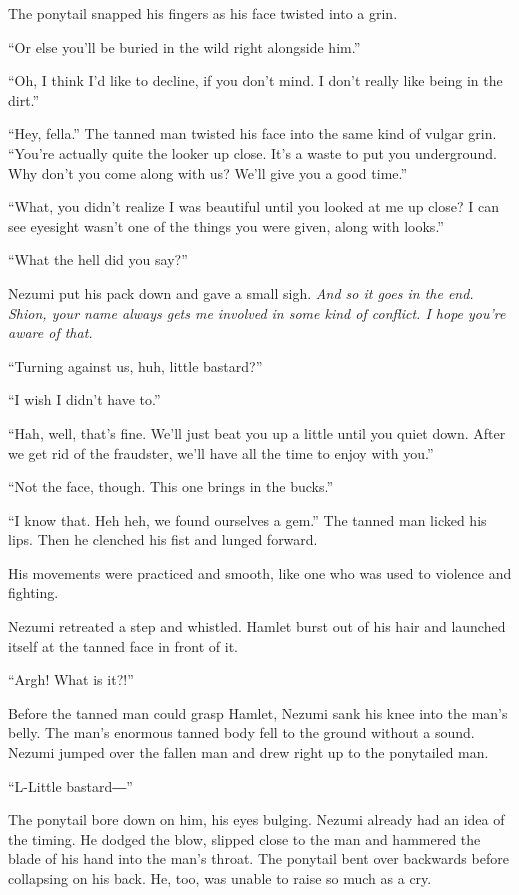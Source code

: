 The ponytail snapped his fingers as his face twisted into a grin.

``Or else you'll be buried in the wild right alongside him.''

``Oh, I think I'd like to decline, if you don't mind. I don't really
like being in the dirt.''

``Hey, fella.'' The tanned man twisted his face into the same kind of
vulgar grin. ``You're actually quite the looker up close. It's a waste
to put you underground. Why don't you come along with us? We'll give you
a good time.''

``What, you didn't realize I was beautiful until you looked at me up
close? I can see eyesight wasn't one of the things you were given, along
with looks.''

``What the hell did you say?''

Nezumi put his pack down and gave a small sigh. \emph{And so it goes in the
end. Shion, your name always gets me involved in some kind of conflict.
I hope you're aware of that.}

``Turning against us, huh, little bastard?''

``I wish I didn't have to.''

``Hah, well, that's fine. We'll just beat you up a little until you
quiet down. After we get rid of the fraudster, we'll have all the time
to enjoy with you.''

``Not the face, though. This one brings in the bucks.''

``I know that. Heh heh, we found ourselves a gem.'' The tanned man
licked his lips. Then he clenched his fist and lunged forward.~

His movements were practiced and smooth, like one who was used to
violence and fighting.

Nezumi retreated a step and whistled. Hamlet burst out of his hair and
launched itself at the tanned face in front of it.

``Argh! What is it?!''

Before the tanned man could grasp Hamlet, Nezumi sank his knee into the
man's belly. The man's enormous tanned body fell to the ground without a
sound. Nezumi jumped over the fallen man and drew right up to the
ponytailed man.

``L-Little bastard―''

The ponytail bore down on him, his eyes bulging. Nezumi already had an
idea of the timing. He dodged the blow, slipped close to the man and
hammered the blade of his hand into the man's throat. The ponytail bent
over backwards before collapsing on his back. He, too, was unable to
raise so much as a cry.

